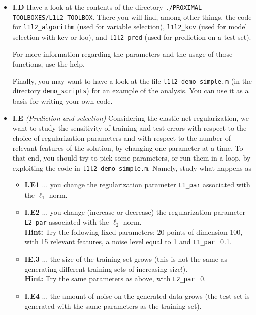 \documentclass[DIN, pagenumber=false, fontsize=11pt, parskip=half]{scrartcl}
\begin{document}
\begin{itemize}


	\item \textbf{I.D} 	Have a look at the contents of the directory \texttt{./PROXIMAL\_} \texttt{TOOLBOXES/L1L2\_TOOLBOX}.
	There you will find, among other things, the code for  \texttt{l1l2\_algorithm} (used for variable selection), \texttt{l1l2\_kcv} (used for model selection with kcv or loo), and \texttt{l1l2\_pred} (used for prediction on a test set).

For more information regarding the parameters and the usage of those functions, use the help.

Finally, you may want to have a look at the file \texttt{l1l2\_demo\_simple.m} (in the directory \texttt{demo\_scripts}) for an example of the analysis.
You can use it as a basis for writing your own code.

	\item \textbf{I.E} \emph{(Prediction and selection)}
	Considering the elastic net regularization, we want to study the sensitivity of training and test errors with respect to the choice of regularization parameters and with respect to the number of relevant features of the solution, by changing one parameter at a time.
	To that end, you should try to pick some parameters, or run them in a loop, by exploiting the code in \texttt{l1l2\_demo\_simple.m}.
  Namely, study what happens as

\begin{itemize}
  \item \textbf{I.E1} ... you change the  regularization parameter \texttt{L1\_par} associated with the $\ell_1$-norm.
  \item \textbf{I.E2} ... you change (increase or decrease) the regularization parameter \texttt{L2\_par} associated with the $\ell_2$-norm.\\
  \textbf{Hint:} Try the following fixed parameters: 20 points of dimension 100, with 15 relevant features, a noise level equal to 1 and \texttt{L1\_par}=0.1.
  \item \textbf{IE.3} ... the size of the training set grows (this is not the same as generating different training sets of increasing size!).\\
  \textbf{Hint:} Try the same parameters as above, with \texttt{L2\_par}=0.
  \item \textbf{I.E4} ... the amount of noise on the generated data grows (the test set is generated with the same parameters as the training set).
\end{itemize}





\end{itemize}
\end{document}
